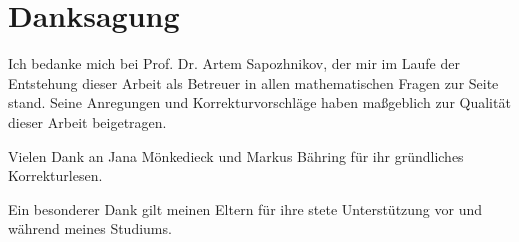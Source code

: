 \chapter*{Danksagung}

Ich bedanke mich bei Prof. Dr. Artem Sapozhnikov,
der mir im Laufe der Entstehung dieser Arbeit als Betreuer in allen mathematischen Fragen zur Seite stand.
Seine Anregungen und Korrekturvorschläge haben maßgeblich zur Qualität dieser Arbeit beigetragen.

Vielen Dank an Jana Mönkedieck und Markus Bähring für ihr gründliches Korrekturlesen.

Ein besonderer Dank gilt meinen Eltern für ihre stete Unterstützung vor und während meines Studiums.